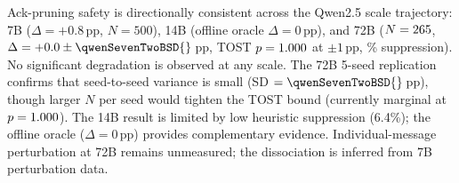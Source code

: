 Ack-pruning safety is directionally consistent across the Qwen2.5 scale trajectory: 7B ($\Delta = +0.8$\,pp, $N = 500$), 14B (offline oracle $\Delta = 0$\,pp), and 72B ($N = 265{}$, $\Delta = \qwenSevenTwoBDelta{} \pm \qwenSevenTwoBSD{}$\,pp, TOST $p = 1.000{}$ at $\pm 1$\,pp, \qwenSevenTwoBSupp{}\% suppression). No significant degradation is observed at any scale. The 72B 5-seed replication confirms that seed-to-seed variance is small (SD $= \qwenSevenTwoBSD{}$\,pp), though larger $N$ per seed would tighten the TOST bound (currently marginal at $p = 1.000{}$).
The 14B result is limited by low heuristic suppression (6.4\%); the offline oracle ($\Delta = 0$\,pp) provides complementary evidence.
Individual-message perturbation at 72B remains unmeasured; the dissociation is inferred from 7B perturbation data.
